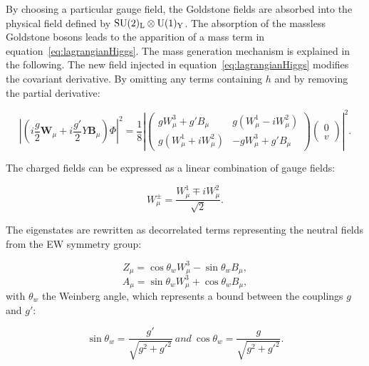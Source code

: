       By choosing a particular gauge field, the Goldstone fields are absorbed into the physical field defined by $\rm{SU}(2)_{\rm{L}} \otimes \rm{U}(1)_{\rm{Y}}$.
      The absorption of the massless Goldstone bosons leads to the apparition of a mass term in equation~\ref{eq:lagrangianHiggs}.
      The mass generation mechanism is explained in the following.
      The new field injected in equation~\ref{eq:lagrangianHiggs} modifies the covariant derivative.
      By omitting any terms containing $h$ and by removing the partial derivative: 

      \begin{equation}
        \left|\left(i\frac{g}{2}\textbf{W}_{\mu} +i\frac{g'}{2}Y\textbf{B}_{\mu}\right) \Phi \right|^2 = \frac{1}{8}\left|
                \begin{pmatrix}
                   gW^3_{\mu} +g'B_{\mu} & g(W^1_{\mu} - i W^2_{\mu}) \\
                   g(W^1_{\mu} + i W^2_{\mu}) & - g W^3_{\mu} + g'B_{\mu}
                \end{pmatrix}
                \begin{pmatrix}
                  0 \\
                  v
                \end{pmatrix}
           \right|^2.
        \label{eq:derHiggs}
      \end{equation}

      The charged fields can be expressed as a linear combination of gauge fields:

      \begin{equation}
        W^{\pm}_{\mu} = \frac{W^1_{\mu} \mp iW^2_{\mu}}{\sqrt{2}}.
      \end{equation}

      The eigenstates are rewritten as decorrelated terms representing the neutral fields from the \gls{EW} symmetry group:

      \begin{equation}
        Z_{\mu} = \cos{\theta_{w}W^3_{\mu}} - \sin{\theta_{w}B_{\mu}},
      \end{equation}
      \begin{equation}
        A_{\mu} = \sin{\theta_{w}W^3_{\mu}} + \cos{\theta_{w}B_{\mu}},
      \end{equation}
      with $\theta_{w}$ the Weinberg angle, which represents a bound between the couplings $g$ and $g'$:
     
      \begin{equation}
        \sin{\theta_{w}} = \frac{g'}{\sqrt{g^2+g'^2}} \ and \ \cos{\theta_{w}} = \frac{g}{\sqrt{g^2+g'^2}}.
      \end{equation} 

